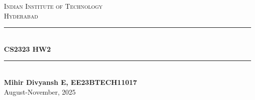\begin{titlepage}

\newcommand{\HRule}{\rule{\linewidth}{0.5mm}} %

\center %
 

\textsc{\LARGE Indian Institute of Technology }\\[0.3cm] 
\textsc{\Large Hyderabad }\\[0.3cm]


\HRule \\[0.4cm]
{ \huge \bfseries CS2323 HW2}\\[0.03cm] %
\HRule \\[0.7cm]

 

\textbf{Mihir Divyansh E, EE23BTECH11017} \\[0.5cm]




{\large August-November, 2025}\\[1cm] %


 

\vfill %

\end{titlepage}

